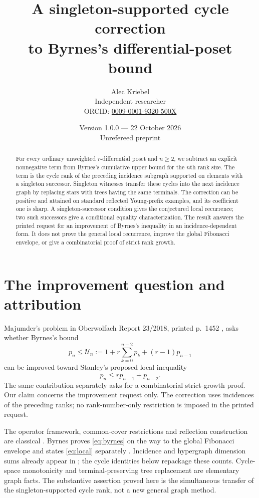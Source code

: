 \documentclass[11pt]{article}
\title{A singleton-supported cycle correction\\to Byrnes's differential-poset bound}
\author{Alec Kriebel\\
\small Independent researcher\\
\small ORCID: \href{https://orcid.org/0009-0001-9320-500X}{0009-0001-9320-500X}}
\date{Version 1.0.0 --- 22 October 2026\\\small Unrefereed preprint}
\theoremstyle{remark}
\newcommand{\By}{\mathcal U}
\begin{document}
\maketitle
\begin{abstract}
For every ordinary unweighted $r$-differential poset and $n\ge2$, we subtract
an explicit nonnegative term from Byrnes's cumulative upper bound for the
$n$th rank size. The term is the cycle rank of the preceding incidence
subgraph supported on elements with a singleton successor. Singleton
witnesses transfer these cycles into the next incidence graph by replacing
stars with trees having the same terminals. The correction can be positive
and attained on standard reflected Young-prefix examples, and its coefficient
one is sharp. A singleton-successor condition gives the conjectured local
recurrence; two such successors give a conditional equality characterization.
The result answers the printed request for an improvement of Byrnes's
inequality in an incidence-dependent form. It does not prove the general
local recurrence, improve the global Fibonacci envelope, or give a
combinatorial proof of strict rank growth.
\end{abstract}

\section{The improvement question and attribution}
Majumder's problem in Oberwolfach Report 23/2018, printed p.~1452
\cite{Majumder}, asks whether Byrnes's bound
\begin{equation}\label{eq:byrnes}
 p_n\le \By_n:=1+r\sum_{k=0}^{n-2}p_k+(r-1)p_{n-1}
\end{equation}
can be improved toward Stanley's proposed local inequality
\begin{equation}\label{eq:local}
 p_n\le r p_{n-1}+p_{n-2}.
\end{equation}
The same contribution separately asks for a combinatorial strict-growth
proof. Our claim concerns the improvement request only. The correction uses
incidences of the preceding ranks; no rank-number-only restriction is imposed
in the printed request.

The operator framework, common-cover restrictions and reflection construction
are classical \cite{Stanley}. Byrnes proves \eqref{eq:byrnes} on the way to the
global Fibonacci envelope and states \eqref{eq:local} separately
\cite[Chapter~5]{Byrnes}. Incidence and hypergraph dimension sums already
appear in \cite[Remark~8]{SZ}; the cycle identities below repackage these
counts. Cycle-space monotonicity and terminal-preserving tree replacement
are elementary graph facts. The substantive assertion proved here is the
simultaneous transfer of the singleton-supported cycle rank, not a new
general graph method.
\end{document}
